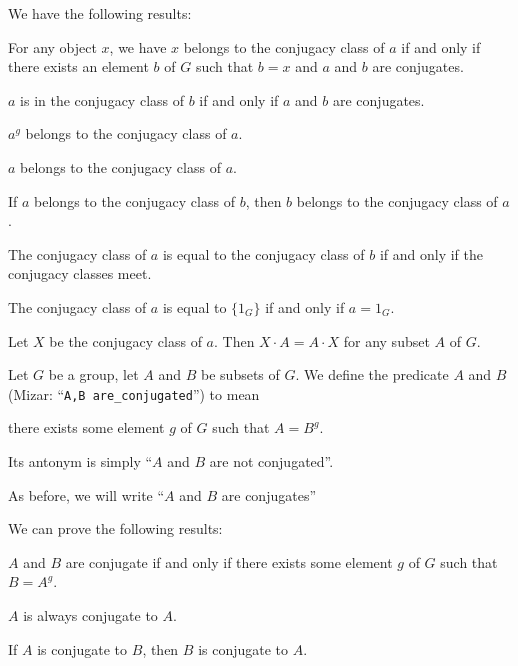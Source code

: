\documentclass{article}
\begin{document}
We have the following results:
\begin{thm}
\item\label{group3:80} For any object $x$, we have $x$ belongs to the conjugacy class of $a$ if and
  only if there exists an element $b$ of $G$ such that $b=x$ and $a$ and
  $b$ are conjugates.
\item\label{group3:81} $a$ is in the conjugacy class of $b$ if and only
  if $a$ and $b$ are conjugates.
\item\label{group3:82} $a^{g}$ belongs to the conjugacy class of $a$.
\item\label{group3:83} $a$ belongs to the conjugacy class of $a$.
\item\label{group3:84} If $a$ belongs to the conjugacy class of $b$,
  then $b$ belongs to the conjugacy class of $a$.
\item\label{group3:85} The conjugacy class of $a$ is equal to the
  conjugacy class of $b$ if and only if the conjugacy classes meet.
\item\label{group3:86} The conjugacy class of $a$ is equal to
  $\{1_{G}\}$ if and only if $a=1_{G}$.
\item\label{group3:87} Let $X$ be the conjugacy class of $a$. Then
  $X\cdot A=A\cdot X$ for any subset $A$ of $G$.
\end{thm}

\begin{definition}
Let $G$ be a group, let $A$ and $B$ be subsets of $G$.
We define the predicate $A$ and $B$  (Mizar:
``\verb#A,B are_conjugated#'') to mean
\begin{defn}
\item there exists some element $g$ of $G$ such that $A=B^{g}$.
\end{defn}
Its antonym is simply ``$A$ and $B$ are not conjugated''.
\end{definition}

\begin{remark}
As before, we will write ``$A$ and $B$ are conjugates''
\end{remark}

We can prove the following results:
\begin{thm}
\item\label{group3:88} $A$ and $B$ are conjugate if and only if there
  exists some element $g$ of $G$ such that $B=A^{g}$.
\item\label{group3:89} $A$ is always conjugate to $A$.
\item\label{group3:90} If $A$ is conjugate to $B$, then $B$ is conjugate
  to $A$.
\end{thm}
\end{document}
